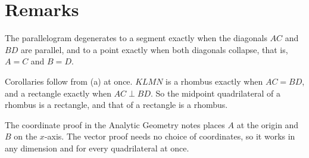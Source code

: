 \documentclass[11pt,a4paper]{article}
\begin{document}
\section{Remarks}

\begin{remark}
  The parallelogram degenerates to a segment exactly when the diagonals $AC$ and
  $BD$ are parallel, and to a point exactly when both diagonals collapse, that is,
  $A = C$ and $B = D$.
\end{remark}

\begin{remark}
  Corollaries follow from (a) at once. $KLMN$ is a rhombus exactly when
  $AC = BD$, and a rectangle exactly when $AC \perp BD$. So the midpoint
  quadrilateral of a rhombus is a rectangle, and that of a rectangle is a rhombus.
\end{remark}

\begin{remark}
  The coordinate proof in the Analytic Geometry notes places $A$ at the origin and
  $B$ on the $x$-axis. The vector proof needs no choice of coordinates, so it works
  in any dimension and for every quadrilateral at once.
\end{remark}
\end{document}
